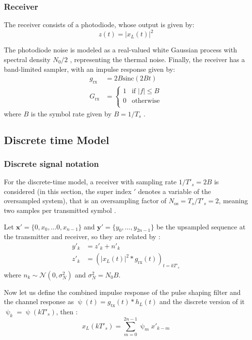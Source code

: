 \subsubsection{Receiver}
The receiver consists of a photodiode, whose output is given by:
\begin{equation}
z(t)=|x_L(t)|^2
\end{equation}

The photodiode noise is modeled as a real-valued white Gaussian process with spectral density $N_0/2$ \cite{Plabst_DD}, representing the thermal noise. Finally, the receiver has a band-limited sampler, with an impulse response given by: 
\begin{align}
	g_\text{rx}&=2B\text{sinc}\left(2Bt\right)\\
	G_\text{rx}&=\left\{
\begin{array}{ll}
1  &  \text{if }|f|\leq B   \\
0  &  \text{otherwise} \\
\end{array}
\right.
\end{align}
where $B$ is the symbol rate given by $B=1/T_s$ \cite{Plabst_DD}.



\subsection{Discrete time Model}

\subsubsection{Discrete signal notation}
For the discrete-time model, a receiver with sampling rate $1/T'_s=2B$ is considered (in this section, the super index $'$ denotes a variable of the oversampled system), that is an oversampling factor of $N_\text{os}=T_s/T'_s=2$, meaning two samples per transmitted symbol \cite{Plabst_DD}.

Let $\bm x'=\{0,x_0,\dotsc0,x_{n-1}\}$ and $\bm y'=\{y_0,\dotsc,y_{2n-1}\}$ be the upsampled sequence at the transmitter and receiver, so they are related by \cite{Plabst_DD}:
\begin{align}
y'_k&=z'_k+n'_k \\
z'_k&=\left(|x_L(t)|^2*g_\text{rx}(t)\right)_{t=kT'_s}
\end{align}
where $n_k\sim\mathcal N(0,\sigma_N^2)$ and $\sigma_N^2=N_0B$.

Now let us define the combined impulse response of the pulse shaping filter and the channel response as $\uppsi(t)=g_\text{tx}(t)*h_L(t)$ and the discrete version of it $\uppsi_k=\uppsi(kT'_s)$, then \cite{Plabst_DD}:
\begin{equation}
x_L(kT'_s)=\sum_{m=0}^{2n-1}\uppsi_mx'_{k-m}
\end{equation}

